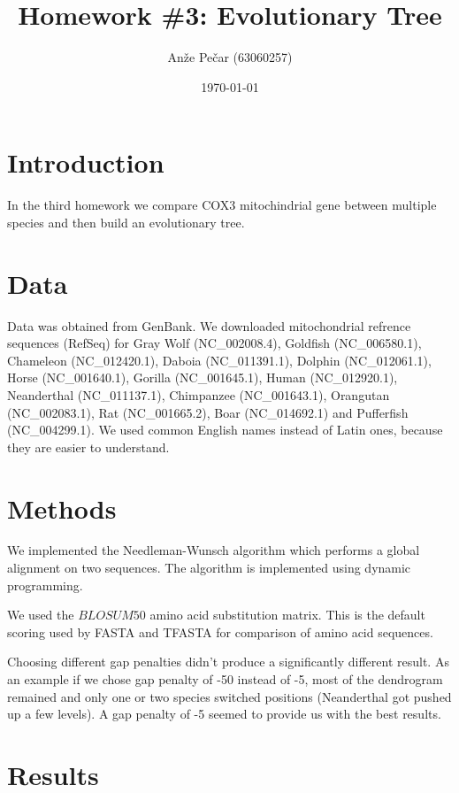 \documentclass[a4paper,11pt]{article}
\title{Homework \#3: Evolutionary Tree}
\author{Anže Pečar (63060257)}
\date{\today}
\begin{document}
\maketitle

\section{Introduction}

In the third homework we compare COX3 mitochindrial gene between multiple species and then build an evolutionary tree.

\section{Data}

Data was obtained from GenBank. We downloaded mitochondrial refrence sequences (RefSeq) for Gray Wolf (NC\_002008.4), Goldfish (NC\_006580.1), Chameleon (NC\_012420.1), Daboia (NC\_011391.1), Dolphin (NC\_012061.1), Horse (NC\_001640.1), Gorilla (NC\_001645.1), Human (NC\_012920.1), Neanderthal (NC\_011137.1), Chimpanzee (NC\_001643.1), Orangutan (NC\_002083.1), Rat (NC\_001665.2), Boar (NC\_014692.1) and Pufferfish (NC\_004299.1). We used common English names instead of Latin ones, because they are easier to understand.


\section{Methods}

We implemented the Needleman-Wunsch algorithm which performs a global alignment on two sequences. The algorithm is implemented using dynamic programming. 

We used the $BLOSUM50$ amino acid substitution matrix. This is the default scoring used by FASTA and TFASTA for comparison of amino acid sequences.

Choosing different gap penalties didn't produce a significantly different result. As an example if we chose gap penalty of -50 instead of -5, most of the dendrogram remained and only one or two species switched positions (Neanderthal got pushed up a few levels). A gap penalty of -5 seemed to provide us with the best results.
\section{Results}
\end{document}
